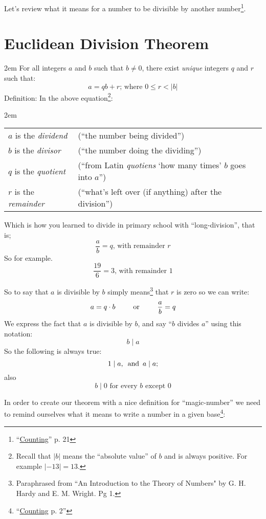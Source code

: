 \documentclass{article}
\newenvironment{jprIn}{\begin{adjustwidth}{2em}{}}{\end{adjustwidth}}
\begin{document}
Let's review what it means for a number to be divisible 
by another
number\footnote{``\href {https://www.dropbox.com/s/bwmrffmkcidnf27/basisReprThm.pdf?dl=0} {Counting}'' p. 21}.

\break
\section*{Euclidean Division Theorem}
\begin{jprIn}
For all integers $a$ and $b$ such that $b\ne0$,
there exist \emph{unique} integers $q$ and $r$ such that:
\[a=qb+r  \text{; where } 0\le{}r<\lvert{}b\rvert\]
Definition: In the above equation\footnote{Recall
that $\lvert{}b\rvert$ means the ``absolute value'' of $b$ and is always positive. For
example $\lvert{}{-13}\rvert = 13$.}:
\begin{jprIn}
\begin{tabular}{l l}
\(a\) is the \emph{dividend} & (``the number being divided'')\\
\(b\) is the \emph{divisor} & (``the number doing the dividing'')\\
\(q\) is the \emph{quotient} & (``from Latin \emph{quotiens} `how many times' \(b\) goes into \(a\)'')\\
\(r\) is the \emph{remainder} & (``what's left over (if anything) after the division'')
\end{tabular}
\end{jprIn}
\end{jprIn}

Which is how you learned to divide in primary school with ``long-division'', that is;
\[\frac{a}{b}=q\text{, with remainder }r\]
So for example.
\[\frac{19}{6}=3\text{, with remainder }1\]

So to say that $a$ is divisible by $b$ simply means\footnote{Paraphrased
from ``An Introduction to the Theory of Numbers" by G. H. Hardy
and E. M. Wright. Pg 1.}
that $r$ is zero
so we can write:
\[a=q\cdot{}b\text{\hspace{2.5em}or\hspace{2.5em}}\frac{a}{b}=q\]
We express the fact that $a$ is divisible by $b$, and say
``$b$ divides $a$'' using this notation:
\[b\mid{}a\]
So the following is always true:
\[1\mid{}a,
\text{\hspace{0.5em}and\hspace{0.5em}}a\mid{}a;\]
also
\[b\mid{}0\text{ for every }b\text{ except }0\]

In order to create our theorem with a 
nice definition for ``magic-number''
we need to remind ourselves 
what it means to write a number in a given
base\footnote{``\href{https://www.dropbox.com/s/bwmrffmkcidnf27/basisReprThm.pdf?dl=0} {Counting} p. 2''}:
\end{document}
